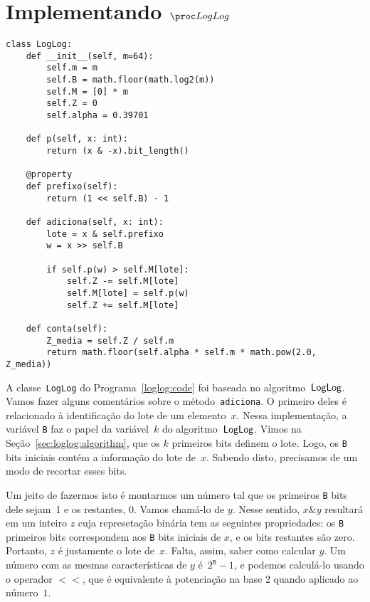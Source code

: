 \section{Implementando $\LOG$}

\begin{lstlisting}[style=mypython,caption=Implementação do algoritmo $\logprogram$,captionpos=b, label=loglog:code]
class LogLog:
    def __init__(self, m=64):
        self.m = m
        self.B = math.floor(math.log2(m))
        self.M = [0] * m
        self.Z = 0
        self.alpha = 0.39701
  
    def p(self, x: int):
        return (x & -x).bit_length()

    @property
    def prefixo(self):
        return (1 << self.B) - 1

    def adiciona(self, x: int):
        lote = x & self.prefixo
        w = x >> self.B

        if self.p(w) > self.M[lote]:
            self.Z -= self.M[lote]
            self.M[lote] = self.p(w)
            self.Z += self.M[lote]

    def conta(self):
        Z_media = self.Z / self.m
        return math.floor(self.alpha * self.m * math.pow(2.0, Z_media))
\end{lstlisting}

A classe~\texttt{LogLog} do Programa~\ref{loglog:code} foi baseada no algoritmo~$\textsf{LogLog}$. Vamos fazer alguns 
comentários sobre o método~\texttt{adiciona}. O primeiro deles é relacionado à identificação do lote de um elemento~$x$.
Nessa implementação, a variável \texttt{B} faz o papel da variável~$k$ do algoritmo~$\textsf{LogLog}$. Vimos na 
Seção~\ref{sec:loglog:algorithm}, que os $k$ primeiros bits definem o lote. Logo, os \texttt{B} bits iniciais contém a
informação do lote de~$x$. Sabendo disto, precisamos de um modo de recortar esses bits. 

Um jeito de fazermos isto é montarmos um número tal que os primeiros \texttt{B} bits dele sejam~1 e os restantes, 0. 
Vamos chamá-lo de $y$. Nesse sentido, $x \mathbin{\&} y$ resultará em um inteiro $z$ cuja represetação binária tem as 
seguintes propriedades: os \texttt{B} primeiros bits correspondem aos \texttt{B} bits iniciais de $x$, e os bits 
restantes são zero. Portanto, $z$ é justamente o lote de~$x$. Falta, assim, saber como calcular $y$. Um número com as 
mesmas características de $y$ é~$2^{\texttt{B}} - 1$, e podemos calculá-lo usando o operador $<<$, que é equivalente à 
potenciação na base $2$ quando aplicado ao número~$1$.


